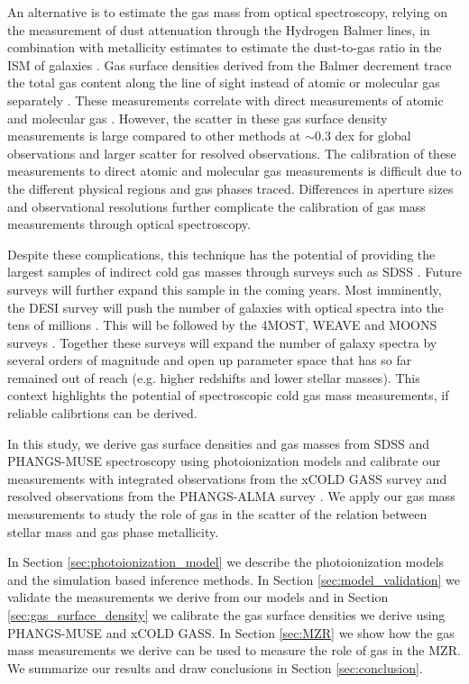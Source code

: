 \documentclass[fleqn,usenatbib]{mnras}
\begin{document}
An alternative is to estimate the gas mass from optical spectroscopy, relying on the measurement of dust attenuation through the Hydrogen Balmer lines, in combination with metallicity estimates to estimate the dust-to-gas ratio in the ISM of galaxies \citep{guver2009, heiderman2010, brinchmann2013}. Gas surface densities derived from the Balmer decrement trace the total gas content along the line of sight instead of atomic or molecular gas separately \citep{concas2019, barrera-ballesteros2020}. These measurements  correlate with direct measurements of atomic and molecular gas \citep{concas2019, yesuf2019, piotrowska2020, barrera-ballesteros2020}. However, the scatter in these gas surface density measurements is large compared to other methods at $\sim$0.3 dex for global observations and larger scatter for resolved observations. The calibration of these measurements to direct atomic and molecular gas measurements is difficult due to the different physical regions and gas phases traced. Differences in aperture sizes and observational resolutions further complicate the calibration of gas mass measurements through optical spectroscopy. 

Despite these complications, this technique has the potential of providing the largest samples of indirect cold gas masses through surveys such as SDSS \citep[][]{abazajian2009, piotrowska2020}. Future surveys will further expand this sample in the coming years. Most imminently, the DESI survey will push the number of galaxies with optical spectra into the tens of millions \citep{desi2022}. This will be followed by the 4MOST, WEAVE and MOONS surveys \citep[][]{driver2019, dalton2012, cirasuolo2020}. Together these surveys will expand the number of galaxy spectra by several orders of magnitude and open up parameter space that has so far remained out of reach (e.g. higher redshifts and lower stellar masses). This context highlights the potential of spectroscopic cold gas mass measurements, if reliable calibrtions can be derived.  

In this study, we derive gas surface densities and gas masses from SDSS and PHANGS-MUSE spectroscopy using photoionization models and calibrate our measurements with integrated observations from the xCOLD GASS survey and resolved observations from the PHANGS-ALMA survey \citep[][]{emsellem2021, leroy2021}. We apply our gas mass measurements to study the role of gas in the scatter of the relation between stellar mass and gas phase metallicity.

In Section \ref{sec:photoionization_model} we describe the photoionization models and the simulation based inference methods. In Section \ref{sec:model_validation} we validate the measurements we derive from our models and in Section \ref{sec:gas_surface_density} we calibrate the gas surface densities we derive using PHANGS-MUSE and xCOLD GASS. In Section \ref{sec:MZR} we show how the gas mass measurements we derive can be used to measure the role of gas in the MZR. We summarize our results and draw conclusions in Section \ref{sec:conclusion}.
\end{document}
